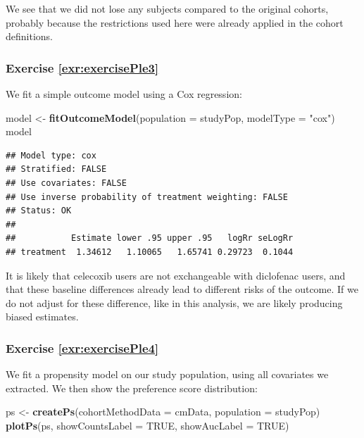 \documentclass[11pt]{book}
\newenvironment{Shaded}{\begin{snugshade}}{\end{snugshade}}
\newcommand{\KeywordTok}[1]{\textcolor[rgb]{0.13,0.29,0.53}{\textbf{#1}}}
\newcommand{\DataTypeTok}[1]{\textcolor[rgb]{0.13,0.29,0.53}{#1}}
\newcommand{\StringTok}[1]{\textcolor[rgb]{0.31,0.60,0.02}{#1}}
\newcommand{\OtherTok}[1]{\textcolor[rgb]{0.56,0.35,0.01}{#1}}
\newcommand{\NormalTok}[1]{#1}
\theoremstyle{definition}
\theoremstyle{definition}
\theoremstyle{definition}
\theoremstyle{remark}
\begin{document}
We see that we did not lose any subjects compared to the original
cohorts, probably because the restrictions used here were already
applied in the cohort definitions.

\subsubsection*{Exercise
\ref{exr:exercisePle3}}\label{exercise-refexrexerciseple3}

We fit a simple outcome model using a Cox regression:

\begin{Shaded}
\begin{Highlighting}[]
\NormalTok{model <-}\StringTok{ }\KeywordTok{fitOutcomeModel}\NormalTok{(}\DataTypeTok{population =}\NormalTok{ studyPop,}
                         \DataTypeTok{modelType =} \StringTok{"cox"}\NormalTok{)}
\NormalTok{model}
\end{Highlighting}
\end{Shaded}

\begin{verbatim}
## Model type: cox
## Stratified: FALSE
## Use covariates: FALSE
## Use inverse probability of treatment weighting: FALSE
## Status: OK
## 
##           Estimate lower .95 upper .95   logRr seLogRr
## treatment  1.34612   1.10065   1.65741 0.29723  0.1044
\end{verbatim}

It is likely that celecoxib users are not exchangeable with diclofenac
users, and that these baseline differences already lead to different
risks of the outcome. If we do not adjust for these difference, like in
this analysis, we are likely producing biased estimates.

\subsubsection*{Exercise
\ref{exr:exercisePle4}}\label{exercise-refexrexerciseple4}

We fit a propensity model on our study population, using all covariates
we extracted. We then show the preference score distribution:

\begin{Shaded}
\begin{Highlighting}[]
\NormalTok{ps <-}\StringTok{ }\KeywordTok{createPs}\NormalTok{(}\DataTypeTok{cohortMethodData =}\NormalTok{ cmData,}
               \DataTypeTok{population =}\NormalTok{ studyPop)}
\KeywordTok{plotPs}\NormalTok{(ps, }\DataTypeTok{showCountsLabel =} \OtherTok{TRUE}\NormalTok{, }\DataTypeTok{showAucLabel =} \OtherTok{TRUE}\NormalTok{)}
\end{Highlighting}
\end{Shaded}
\end{document}
